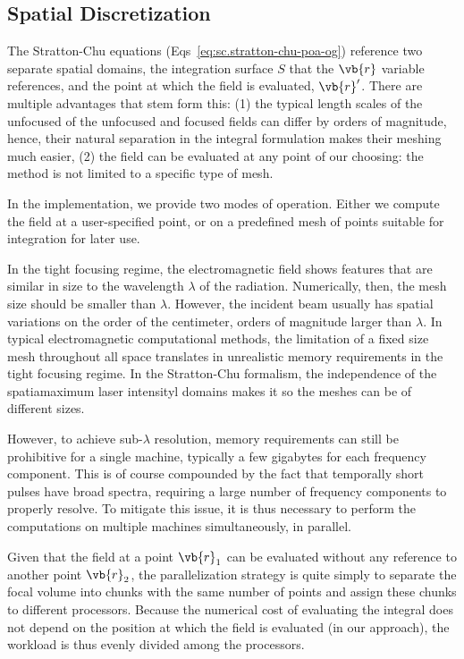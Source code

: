 \documentclass[11pt,SymmetricalJury]{inrsthesis/inrsthesis}
\begin{document}
\subsection{Spatial Discretization}

The Stratton-Chu equations (Eqs~\eqref{eq:sc.stratton-chu-poa-og}) reference two
separate spatial domains, the integration surface $S$ that the $\vb{r}$ variable
references, and the point at which the field is evaluated, $\vb{r}'$. There are
multiple advantages that stem form this: (1) the typical length scales of the
unfocused of the unfocused and focused fields can differ by orders of magnitude,
hence, their natural separation in the integral formulation makes their meshing
much easier, (2)  the field can be evaluated at any point of our choosing:
the method is not limited to a specific type of mesh.

In the implementation, we provide two modes of operation. Either we compute the
field at a user-specified point, or on a predefined mesh of points suitable
for integration for later use.

In the tight focusing regime, the electromagnetic field shows features that
are similar in size to the wavelength $\lambda$ of the radiation. Numerically,
then, the mesh size should be smaller than $\lambda$. However, the incident
beam usually has spatial variations on the order of the centimeter, orders
of magnitude larger than $\lambda$. In typical electromagnetic computational
methods, the limitation of a fixed size mesh throughout all space translates
in unrealistic memory requirements in the tight focusing regime. In the
Stratton-Chu formalism, the independence of the spatiamaximum laser intensityl domains makes it so
the meshes can be of different sizes.

However, to achieve sub-$\lambda$ resolution, memory requirements can still be
prohibitive for a single machine, typically a few gigabytes for each frequency
component. This is of course compounded by the fact that temporally short pulses
have broad spectra, requiring a large number of frequency components to properly
resolve. To mitigate this issue, it is thus necessary to perform the computations
on multiple machines simultaneously, in parallel.

Given that the field at a point $\vb{r}_1$ can be evaluated without any reference
to another point $\vb{r}_2$, the parallelization strategy is quite simply to
separate the focal volume into chunks with the same number of points and assign
these chunks to different processors. Because the numerical cost of evaluating
the integral does not depend on the position at which the field is evaluated
(in our approach), the workload is thus evenly divided among the processors.
\end{document}
